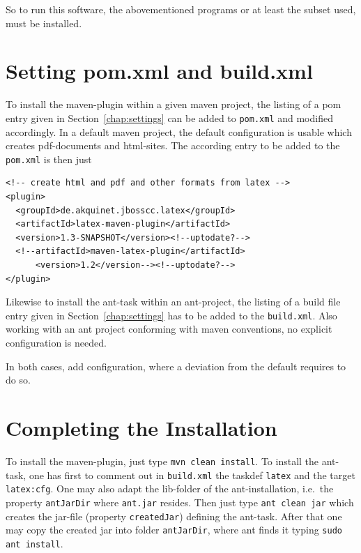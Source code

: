 \documentclass[12pt]{book}
\begin{document}
So to run this software, the abovementioned programs 
or at least the subset used, must be installed. 

\section{Setting pom.xml and build.xml}\label{sec:sgml}

To install the maven-plugin within a given maven project, 
the listing of a pom entry given in Section~\ref{chap:settings} 
can be added to {\tt pom.xml} and modified accordingly. 
In a default maven project, 
the default configuration is usable which creates pdf-documents and
\gls{html}-sites. 
The according entry to be added to the {\tt pom.xml} is then just 
%
\lstset{language=xml, basicstyle=\small}
\begin{lstlisting}
<!-- create html and pdf and other formats from latex -->
<plugin>
  <groupId>de.akquinet.jbosscc.latex</groupId>
  <artifactId>latex-maven-plugin</artifactId>
  <version>1.3-SNAPSHOT</version><!--uptodate?-->
  <!--artifactId>maven-latex-plugin</artifactId>
      <version>1.2</version--><!--uptodate?-->
</plugin>
\end{lstlisting}

Likewise to install the ant-task within an ant-project, 
the listing of a build file entry given in Section~\ref{chap:settings} 
has to be added to the {\tt build.xml}. 
Also working with an ant project 
conforming with maven conventions, 
no explicit configuration is needed. 

In both cases, add configuration, 
where a deviation from the default requires to do so. 



\section{Completing the Installation}\label{sec:instComplete}

To install the maven-plugin, just type {\tt mvn clean install}. 
To install the ant-task, one has first to comment out in {\tt build.xml} 
the taskdef {\tt latex} and the target {\tt latex:cfg}. 
One may also adapt the lib-folder of the ant-installation, 
i.e.~the property {\tt antJarDir} where {\tt ant.jar} resides. 
Then just type {\tt ant clean jar} 
which creates the jar-file (property {\tt createdJar}) defining the ant-task. 
After that one may copy the created jar into folder {\tt antJarDir}, 
where ant finds it typing {\tt sudo ant install}. 
\end{document}
